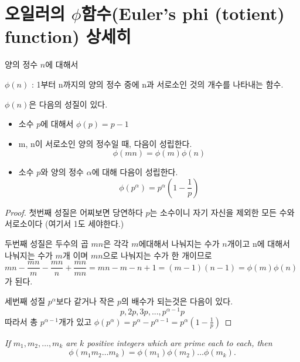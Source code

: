 \section{오일러의 $\phi$함수(Euler’s phi (totient) function) 상세히 }
\begin{dfn}
    양의 정수 $n$에 대해서 

    $\phi (n)$ : 1부터 n까지의 양의 정수 중에 n과 서로소인 것의 개수를 나타내는 함수.    
\end{dfn}

$\phi (n)$은 다음의 성질이 있다.

\begin{theorem}
    \begin{itemize}
        \item{소수 $p$에 대해서  $\phi (p)=p-1$}
        
        \item{ m, n이 서로소인 양의 정수일 때, 다음이 성립한다. \[\phi (mn)=\phi (m)\phi (n)\]}
        
        \item 소수 $p$와 양의 정수 $\alpha$에 대해 다음이 성립한다.
        $$\phi(p^\alpha) = p^\alpha \left ( 1 - \frac{1}{p} \right )$$
        \end{itemize}
\end{theorem}

\begin{proof}

첫번째 성질은 어찌보면 당연하다 $p$는 소수이니 자기 자신을 제외한 모든 수와 서로소이다 (여기서 1도 세야한다.)


두번째 성질은 두수의 곱 $mn$은 각각 $m$에대해서 나눠지는 수가 $n$개이고 n에 대해서 나눠지는 수가 $m$개 이며 $mn$으로 나눠지는 수가 한 개이므로 
$mn -\dfrac{mn}{m}-\dfrac{mn}{n}+\dfrac{mn}{mn} =mn -m -n +1=(m-1)(n-1)=\phi (m)\phi(n)$가 된다.

세번째 성질 $p^\alpha$보다 같거나 작은 $p$의 배수가 되는것은 다음이 있다.
$$p , 2p , 3p , ... , p^{\alpha-1}p$$
따라서 총 $p^{\alpha-1}$개가 있고 
$ \phi(p^\alpha) =p^{\alpha} -  p^{\alpha-1} = p^\alpha \left ( 1 - \frac{1}{p} \right )$

\end{proof}

\begin{corollary}
    \emph{If $m_1, m_2, \ldots, m_k$ are $k$ positive
    integers which are prime each to each, then}
    \begin{equation*}
    \phi(m_1 m_2 \ldots m_k) = \phi(m_1) \phi(m_2) \ldots \phi(m_k).
    \end{equation*}
\end{corollary}


